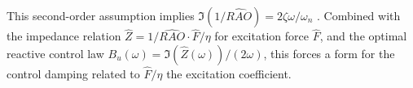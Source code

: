 \documentclass[10pt,twoside]{article}
\begin{document}
This second-order assumption implies $\Im(1/\widehat{RAO})=2\zeta\omega/\omega_n$ \cite{franklin2014feedback}.
Combined with the impedance relation $\hat{Z}=1/\widehat{RAO} \cdot \hat{F}/\eta$ for excitation force $\hat{F}$, and the optimal reactive control law $B_u(\omega) = \Im(\hat{Z}(\omega))/(2\omega)$, this forces a form for the control damping related to $\hat{F}/\eta$ the excitation coefficient.



\end{document}
